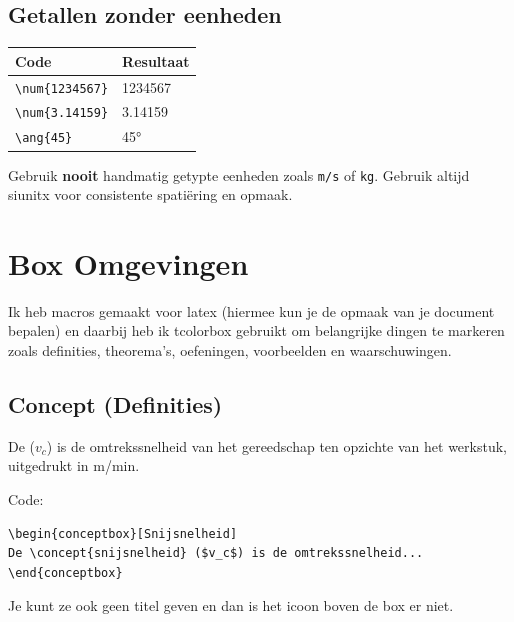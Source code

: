 \documentclass[a4paper,11pt]{article}
\begin{document}
\subsection{Getallen zonder eenheden}

\begin{tabular}{ll}
\toprule
\textbf{Code} & \textbf{Resultaat} \\
\midrule
\verb|\num{1234567}| & \num{1234567} \\
\verb|\num{3.14159}| & \num{3.14159} \\
\verb|\ang{45}| & \ang{45} \\
\bottomrule
\end{tabular}

\begin{examenbox}
Gebruik \textbf{nooit} handmatig getypte eenheden zoals \verb|m/s| of \verb|kg|.
Gebruik altijd siunitx voor consistente spatiëring en opmaak.
\end{examenbox}

\section{Box Omgevingen}
\label{sec:boxes}

Ik heb macros gemaakt voor latex (hiermee kun je de opmaak van je document bepalen) 
en daarbij heb ik tcolorbox gebruikt om belangrijke dingen 
te markeren zoals definities, theorema's, oefeningen, voorbeelden en waarschuwingen.

\subsection{Concept (Definities)}

\begin{conceptbox}[Snijsnelheid]
De  ($v_c$) is de omtrekssnelheid van het gereedschap ten opzichte
van het werkstuk, uitgedrukt in \si{m/min}.
\end{conceptbox}

Code:
\begin{verbatim}
\begin{conceptbox}[Snijsnelheid]
De \concept{snijsnelheid} ($v_c$) is de omtrekssnelheid...
\end{conceptbox}
\end{verbatim}

Je kunt ze ook geen titel geven en dan is het icoon boven de box er niet.
\end{document}
